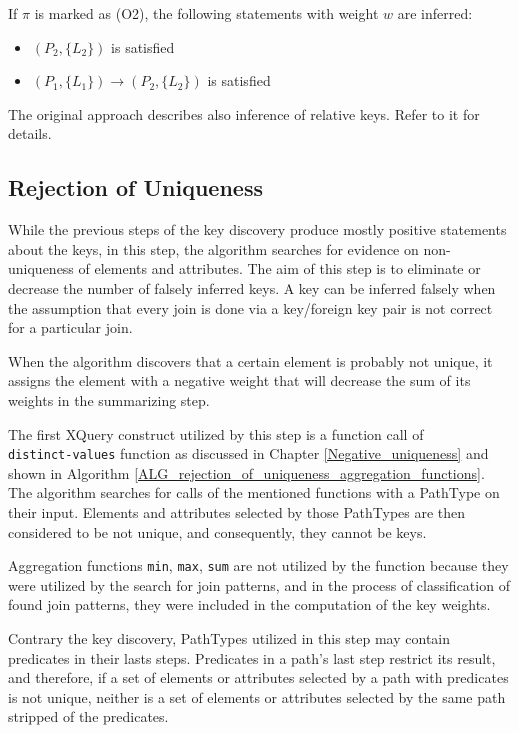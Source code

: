 If $\pi$ is marked as (O2), the following statements with weight $w$ are inferred:
\begin{itemize}
\item $(P_2, \{L_2\})$ is satisfied
\item $(P_1, \{L_1\}) \rightarrow (P_2, \{L_2\})$ is satisfied
\end{itemize}

The original approach \cite{Necasky:2009:DXK:1529282.1529414} describes also inference of relative keys. Refer to it for details.

\subsection{Rejection of Uniqueness}
While the previous steps of the key discovery produce mostly positive statements about the keys, in this step, the algorithm searches for evidence on non-uniqueness of elements and attributes. The aim of this step is to eliminate or decrease the number of falsely inferred keys. A key can be inferred falsely when the assumption that every join is done via a key/foreign key pair is not correct for a particular join.

When the algorithm discovers that a certain element is probably not unique, it assigns the element with a negative weight that will decrease the sum of its weights in the summarizing step.

The first XQuery construct utilized by this step is a function call of \\ \texttt{distinct-values} function as discussed in Chapter \ref{Negative_uniqueness} and shown in Algorithm \ref{ALG_rejection_of_uniqueness_aggregation_functions}. The algorithm searches for calls of the mentioned functions with a PathType on their input. Elements and attributes selected by those PathTypes are then considered to be not unique, and consequently, they cannot be keys.

Aggregation functions \texttt{min}, \texttt{max}, \texttt{sum} are not utilized by the function because they were utilized by the search for join patterns, and in the process of classification of found join patterns, they were included in the computation of the key weights.

Contrary the key discovery, PathTypes utilized in this step may contain predicates in their lasts steps. Predicates in a path's last step restrict its result, and therefore, if a set of elements or attributes selected by a path with predicates is not unique, neither is a set of elements or attributes selected by the same path stripped of the predicates.

